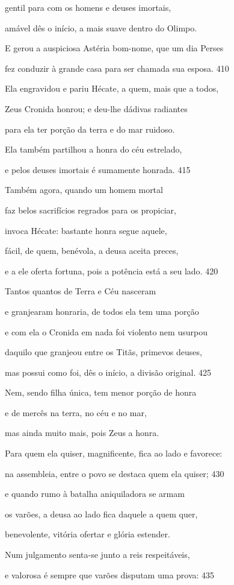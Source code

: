 gentil para com os homens e deuses imortais,

amável dês o início, a mais suave dentro do Olimpo.

E gerou a auspiciosa Astéria bom-nome, que um dia Perses

fez conduzir à grande casa para ser chamada sua esposa. \num{410}

\quad{}Ela engravidou e pariu Hécate, a quem, mais que a todos,

Zeus Cronida honrou; e deu-lhe dádivas radiantes

para ela ter porção da terra e do mar ruidoso.

Ela também partilhou a honra do céu estrelado,

e pelos deuses imortais é sumamente honrada. \num{415}

Também agora, quando um homem mortal

faz belos sacrifícios regrados para os propiciar,

invoca Hécate: bastante honra segue aquele,

fácil, de quem, benévola, a deusa aceita preces,

e a ele oferta fortuna, pois a potência está a seu lado. \num{420}

Tantos quantos de Terra e Céu nasceram

e granjearam honraria, de todos ela tem uma porção

e com ela o Cronida em nada foi violento nem usurpou

daquilo que granjeou entre os Titãs, primevos deuses,

mas possui como foi, dês o início, a divisão original. \num{425}

Nem, sendo filha única, tem menor porção de honra

e de mercês na terra, no céu e no mar,

mas ainda muito mais, pois Zeus a honra.

Para quem ela quiser, magnificente, fica ao lado e favorece:

na assembleia, entre o povo se destaca quem ela quiser; \num{430}

e quando rumo à batalha aniquiladora se armam

os varões, a deusa ao lado fica daquele a quem quer,

benevolente, vitória ofertar e glória estender.

Num julgamento senta-se junto a reis respeitáveis,

e valorosa é sempre que varões disputam uma prova: \num{435}

